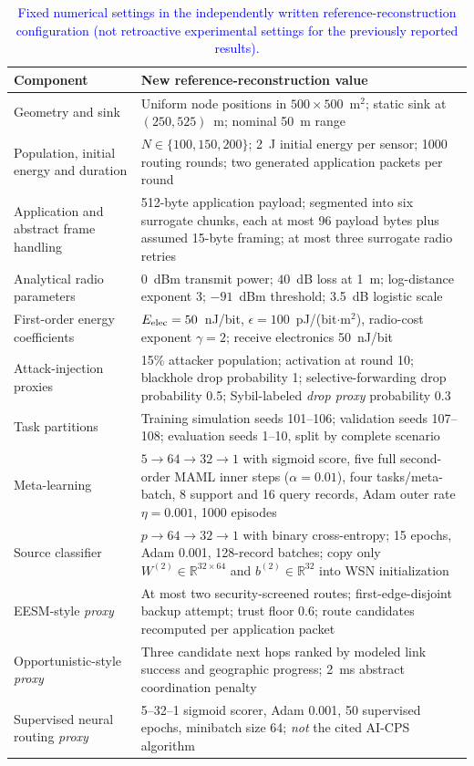 \documentclass[pdflatex,sn-mathphys-num]{sn-jnl}
\newcommand{\Revised}[1]{\textcolor{blue}{#1}}
\begin{document}
\begin{table}[ht]
\centering\small
\caption{\Revised{Fixed numerical settings in the independently written reference-reconstruction configuration (not retroactive experimental settings for the previously reported results).}}
\label{tab:newreferenceparams}
\begin{tabular}{p{}p{}}
\toprule
\textbf{Component} & \textbf{New reference-reconstruction value}\\
\midrule
Geometry and sink & Uniform node positions in $500\times500$~m$^2$; static sink at $(250,525)$~m; nominal 50~m range\\
Population, initial energy and duration & $N\in\{100,150,200\}$; 2~J initial energy per sensor; 1000 routing rounds; two generated application packets per round\\
Application and abstract frame handling & 512-byte application payload; segmented into six surrogate chunks, each at most 96 payload bytes plus assumed 15-byte framing; at most three surrogate radio retries\\
Analytical radio parameters & 0~dBm transmit power; $40$~dB loss at 1~m; log-distance exponent 3; $-91$~dBm threshold; 3.5~dB logistic scale\\
First-order energy coefficients & $E_{\rm elec}=50$~nJ/bit, $\epsilon=100$~pJ/(bit$\cdot$m$^2$), radio-cost exponent $\gamma=2$; receive electronics 50~nJ/bit\\
Attack-injection proxies & 15\% attacker population; activation at round 10; blackhole drop probability 1; selective-forwarding drop probability 0.5; Sybil-labeled \emph{drop proxy} probability 0.3\\
Task partitions & Training simulation seeds 101--106; validation seeds 107--108; evaluation seeds 1--10, split by complete scenario\\
Meta-learning & $5\rightarrow64\rightarrow32\rightarrow1$ with sigmoid score, five full second-order MAML inner steps ($\alpha=0.01$), four tasks/meta-batch, 8 support and 16 query records, Adam outer rate $\eta=0.001$, 1000 episodes\\
Source classifier & $p\rightarrow64\rightarrow32\rightarrow1$ with binary cross-entropy; 15 epochs, Adam 0.001, 128-record batches; copy only $W^{(2)}\in\mathbb R^{32\times64}$ and $b^{(2)}\in\mathbb R^{32}$ into WSN initialization\\
EESM-style \emph{proxy} & At most two security-screened routes; first-edge-disjoint backup attempt; trust floor 0.6; route candidates recomputed per application packet\\
Opportunistic-style \emph{proxy} & Three candidate next hops ranked by modeled link success and geographic progress; 2~ms abstract coordination penalty\\
Supervised neural routing \emph{proxy} & 5--32--1 sigmoid scorer, Adam 0.001, 50 supervised epochs, minibatch size 64; \emph{not} the cited AI-CPS algorithm\\
\bottomrule
\end{tabular}
\end{table}
\end{document}
